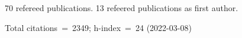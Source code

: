 70 refereed publications. 13 refeered publications as first author.

Total citations~=~2349; h-index~=~24 (2022-03-08)